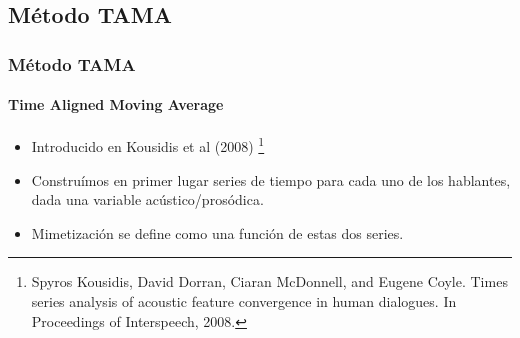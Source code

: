 \subsection{Método TAMA}






\begin{frame}
  \frametitle{Método TAMA}
  \framesubtitle{Time Aligned Moving Average}
  \begin{itemize}
    \item Introducido en Kousidis et al (2008) \footnote{Spyros Kousidis, David Dorran, Ciaran McDonnell, and Eugene Coyle. Times series analysis of acoustic feature convergence in human dialogues. In
Proceedings of Interspeech, 2008.}
    \item Construímos en primer lugar series de tiempo para cada uno de los hablantes, dada una variable acústico/prosódica.
    \item Mimetización se define como una función de estas dos series.
  \end{itemize}
\end{frame}


